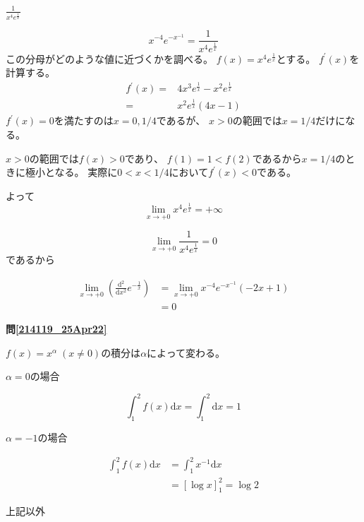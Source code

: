 \documentclass[12pt,b5paper]{ltjsarticle}
\begin{document}
\dotfill
$\frac{1}{x^4e^{\frac{1}{x}}}$
\dotfill


\begin{equation}
 x^{-4}e^{-x^{-1}} = \frac{1}{x^4e^{\frac{1}{x}}}
\end{equation}
この分母がどのような値に近づくかを調べる。
$f(x)= x^4e^{\frac{1}{x}}$とする。
$f^\prime (x)$を計算する。
\begin{align}
 f^\prime (x)
 =& 4x^3e^{\frac{1}{x}} - x^2e^{\frac{1}{x}}\\
 =& x^2e^{\frac{1}{x}} (4x - 1)
\end{align}
$f^\prime (x)=0$を満たすのは$x=0,1/4$であるが、
$x>0$の範囲では$x=1/4$だけになる。

$x>0$の範囲では$f(x)>0$であり、
$f(1)=1<f(2)$であるから$x=1/4$のときに極小となる。
実際に$0<x<1/4$において$f^\prime (x)<0$である。

よって
\begin{equation}
 \lim_{x\rightarrow +0} x^4e^{\frac{1}{x}} = +\infty
\end{equation}



\dotfill


\begin{equation}
 \lim_{x\rightarrow +0}\frac{1}{x^4e^{\frac{1}{x}}} = 0
\end{equation}
であるから

\begin{align}
 \lim_{x\rightarrow +0}\left( \frac{\mathrm{d}^2}{\mathrm{d}x^2}e^{-\frac{1}{x}}\right)
 &= \lim_{x\rightarrow +0} x^{-4}e^{-x^{-1}} (  -2x + 1 )\\
 &= 0
\end{align}

\hrulefill

\textbf{問\ref{214119_25Apr22}}

$f(x)=x^\alpha \; (x\ne 0)$の積分は$\alpha$によって変わる。

$\alpha=0$の場合

\begin{equation}
  \int_1^2 f(x) \mathrm{d}x = \int_1^2 \mathrm{d}x = 1
\end{equation}

$\alpha=-1$の場合

\begin{align}
 \int_1^2 f(x) \mathrm{d}x
 &= \int_1^2 x^{-1} \mathrm{d}x\\
 &= \left[\log x\right]_1^2 = \log 2
\end{align}

上記以外
\end{document}
